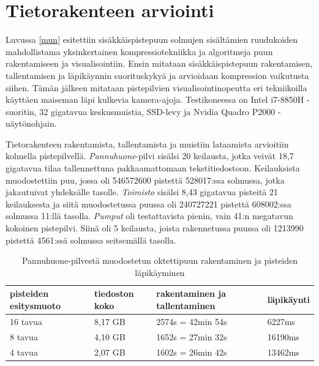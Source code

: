 \section{Tietorakenteen arviointi}\label{tulokset}

Luvussa \ref{mun} esitettiin sisäkkäispistepuun solmujen sisältämien ruudukoiden mahdollistama yksinkertainen kompressiotekniikka ja algoritmeja puun rakentamiseen ja visualisointiin. Ensin mitataan sisäkkäispistepuun rakentamisen, tallentamisen ja läpikäynnin suorituskykyä ja arvioidaan kompression vaikutusta siihen. Tämän jälkeen mitataan pistepilvien visualisointinopeutta eri tekniikoilla käyttäen maiseman läpi kulkevia kamera-ajoja. Testikoneessa on Intel i7-8850H -suoritin, 32 gigatavua keskusmuistia, SSD-levy ja Nvidia Quadro P2000 -näytönohjain.  

Tietorakenteen rakentamista, tallentamista ja muistiin lataamista arvioitiin kolmella pistepilvellä. \emph{Pannuhuone}-pilvi sisälsi 20 keilausta, jotka veivät 18,7 gigatavua tilaa tallennettuna pakkaamattomaan tekstitiedostoon. Keilauksista muodostettiin puu, jossa oli 546572600 pistettä 528017:ssa solmussa, jotka jakautuivat yhdeksälle tasolle. \emph{Toimisto} sisälsi 8,43 gigatavua pisteitä 21 keilauksesta ja siitä muodostetussa puussa oli 240727221 pistettä 608002:ssa solmussa 11:llä tasolla. \emph{Pumput} oli testattavista pienin, vain 41:n megatavun kokoinen pistepilvi. Siinä oli 5 keilausta, joista rakennetussa puussa oli 1213990 pistettä 4561:ssä solmussa seitsemällä tasolla.  

\begin{table}[h]
    \begin{tabular}{llll}
    \hline
    pisteiden esitysmuoto & tiedoston koko & rakentaminen ja tallentaminen & läpikäynti \\ \hline
    16 tavua       & 8,17 GB             & 2574s = 42min 54s              & 6227ms     \\
    8 tavua        & 4,10 GB             & 1652s = 27min 32s             & 16190ms    \\
    4 tavua        & 2,07 GB             & 1602s = 26min 42s             & 13462ms    \\ \hline
    \end{tabular}
    \caption{Pannuhuone-pilvestä muodostetun oktettipuun rakentaminen ja pisteiden läpikäyminen}
    \label{taulukko:pannuhuone}
\end{table}


